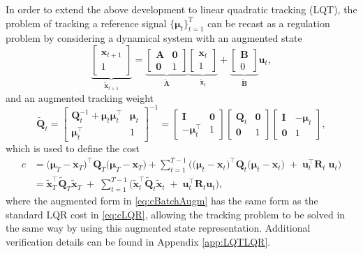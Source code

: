 \documentclass[10pt,a4paper]{article} %
\newcommand{\trsp}{{\scriptscriptstyle\top}}
\begin{document}
In order to extend the above development to linear quadratic tracking (LQT), the problem of tracking a reference signal $\{\bm{\mu}_t\}_{t=1}^T$ can be recast as a regulation problem by considering a dynamical system with an augmented state 
\begin{equation}
  \underbrace{\left[\begin{matrix} \bm{x}_{t+1} \\ 1 \end{matrix}\right]}_{\bm{\tilde{x}}_{t+1}}
  = 
  \underbrace{\left[\begin{matrix} \bm{A} & \bm{0} \\ \bm{0} & 1 \end{matrix}\right]}_{\bm{\tilde{A}}}
  \underbrace{\left[\begin{matrix} \bm{x}_t \\ 1 \end{matrix}\right]}_{\bm{\tilde{x}}_t}
  + 
  \underbrace{\left[\begin{matrix} \bm{B} \\ 0 \end{matrix}\right]}_{\bm{\tilde{B}}}
  \bm{u}_t,
  \label{eq:ABaugm}
\end{equation}
and an augmented tracking weight 
\begin{equation*}
	\bm{\tilde{Q}}_t = \begin{bmatrix} \bm{Q}_t^{-1}\!+\!\bm{\mu}_t\bm{\mu}_t^\trsp & \bm{\mu}_t \\ \bm{\mu}_t^\trsp & 1 \end{bmatrix}^{-1} 
	= \begin{bmatrix} \bm{I} & \bm{0} \\ -\bm{\mu}_t^\trsp & 1 \end{bmatrix}
	\begin{bmatrix} \bm{Q}_t & \bm{0} \\ \bm{0} & 1 \end{bmatrix}
	\begin{bmatrix} \bm{I} & -\bm{\mu}_t \\ \bm{0} & 1 \end{bmatrix},
\end{equation*}
which is used to define the cost 
\begin{align}
	c &= {\big(\bm{\mu}_T-\bm{x}_T\big)}^\trsp
	\bm{Q}_T 
	\big(\bm{\mu}_T-\bm{x}_T\big) +
	\sum_{t=1}^{T-1} \Big({\big(\bm{\mu}_t-\bm{x}_t\big)}^\trsp
	\bm{Q}_t  
	\big(\bm{\mu}_t-\bm{x}_t\big) 
	\;+\;
	\bm{u}_t^\trsp \bm{R}_t\; \bm{u}_t \Big)
	\nonumber\\
	&= \bm{\tilde{x}}_T^\trsp \bm{\tilde{Q}}_T \bm{\tilde{x}}_T 
	\;+\;
	\sum_{t=1}^{T-1} \Big(\bm{\tilde{x}}_t^\trsp \bm{\tilde{Q}}_t \bm{\tilde{x}}_t
	\;+\;
	\bm{u}_t^\trsp \bm{R}_t \bm{u}_t \Big),
	\label{eq:cBatchAugm}
\end{align}
where the augmented form in \eqref{eq:cBatchAugm} has the same form as the standard LQR cost in \eqref{eq:cLQR}, allowing the tracking problem to be solved in the same way by using this augmented state representation. Additional verification details can be found in Appendix \ref{app:LQTLQR}.
 
\end{document}
